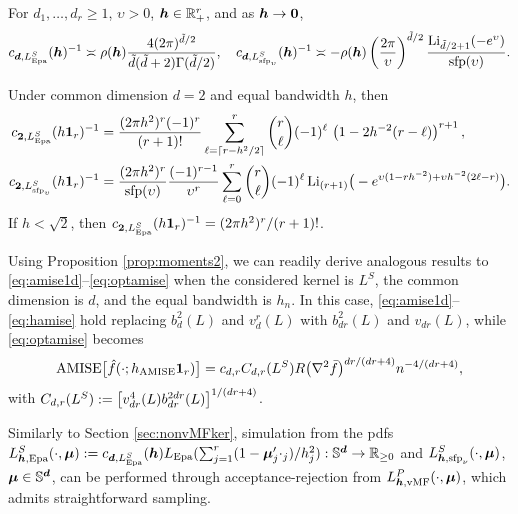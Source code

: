 \documentclass[oneside,11pt]{article}
\begin{document}
\begin{proposition}\label{prop:sp2}
For $d_1,\ldots,d_r\geq 1$, $\upsilon>0$, ${\boldsymbol{h}}\in\mathbb{R}_+^r$, and as ${\boldsymbol{h}}\to\mathbf{0}$,
\begin{align}
    c_{\boldsymbol{d},L_{\mathrm{Epa}}^S}({\boldsymbol{h}})^{-1}\asymp\rho({\boldsymbol{h}})\frac{4(2\pi)^{\tilde{d}/2}}{\tilde{d}(\tilde{d}+2)\Gamma(\tilde{d}/2)}, \quad c_{\boldsymbol{d},L^S_{\mathrm{sfp}_\upsilon}}({\boldsymbol{h}})^{-1}\asymp-\rho({\boldsymbol{h}})\left(\frac{2\pi}{\upsilon}\right)^{\tilde{d}/2} \frac{\mathrm{Li}_{\tilde{d}/2+1}(-e^\upsilon)}{\mathrm{sfp}(\upsilon)}. \label{eq:asymp-c-d2}
\end{align}

Under common dimension $d=2$ and equal bandwidth $h$, then
\begin{align*}
   c_{\mathbf{2},L_\mathrm{Epa}^{S}}(h\mathbf{1}_r)^{-1}&=\frac{(2\pi h^2)^r(-1)^{r}}{(r+1)!}\sum_{\ell=\lceil r-h^2/2 \rceil}^{r}\binom{r}{\ell} (-1)^\ell\, \left(1-2h^{-2}(r-\ell)\right)^{r+1},\\
   c_{\mathbf{2},L_{\mathrm{sfp}_\upsilon}^{S}}(h\mathbf{1}_r)^{-1}&=\frac{(2\pi h^2)^r}{\mathrm{sfp}(\upsilon)}\frac{(-1)^{r-1}}{\upsilon^r}\sum_{\ell=0}^{r}\binom{r}{\ell} (-1)^\ell\, \mathrm{Li}_{(r+1)}\big(-e^{\upsilon(1-rh^{-2})+\upsilon h^{-2}(2\ell-r)}\big).
\end{align*}
If $h<\sqrt{2}$, then $c_{\mathbf{2},L_\mathrm{Epa}^{S}}(h\mathbf{1}_r)^{-1}=(2\pi h^2)^r/(r+1)!$.
\end{proposition}

\begin{remark}\label{rem:optamiseLS}
Using Proposition \ref{prop:moments2}, we can readily derive analogous results to \eqref{eq:amise1d}--\eqref{eq:optamise} when the considered kernel is $L^S$, the common dimension is $d$, and the equal bandwidth is $h_n$. In this case, \eqref{eq:amise1d}--\eqref{eq:hamise} hold replacing $b_d^2(L)$ and $v_{d}^r(L)$ with $b_{dr}^2(L)$ and $v_{dr}(L)$, while \eqref{eq:optamise} becomes
\begin{align}
    \mathrm{AMISE}\big[\hat{f}(\cdot;h_\mathrm{AMISE}\mathbf{1}_r)\big]=c_{d,r}C_{d,r}(L^S)R\big(\nabla^2 \bar{f}\big)^{dr/(dr+4)}n^{-4/(dr+4)},\label{eq:optamiseLS}
\end{align}
with $C_{d,r}(L^S):=\left[v_{dr}^4(L) b^{2dr}_{dr}(L)\right]^{1/(dr+4)}$.
\end{remark}

Similarly to Section \ref{sec:nonvMFker}, simulation from the pdfs $L_{{\boldsymbol{h}},\mathrm{Epa}}^S(\cdot,\boldsymbol\mu):=c_{\boldsymbol{d},L_\mathrm{Epa}^S}({\boldsymbol{h}})L_{\mathrm{Epa}}(\sum_{j=1}^r(1-\boldsymbol\mu_j'\cdot_j)/h_j^2):\mathbb{S}^{\boldsymbol{d}}\to \mathbb{R}_{\geq0}$ and $L_{{\boldsymbol{h}},\mathrm{sfp}_\nu}^S(\cdot,\boldsymbol\mu)$, $\boldsymbol\mu\in\mathbb{S}^{\boldsymbol{d}}$, can be performed through acceptance-rejection from $L_{{\boldsymbol{h}},\mathrm{vMF}}^P(\cdot,\boldsymbol\mu)$, which admits straightforward sampling.
\end{document}
